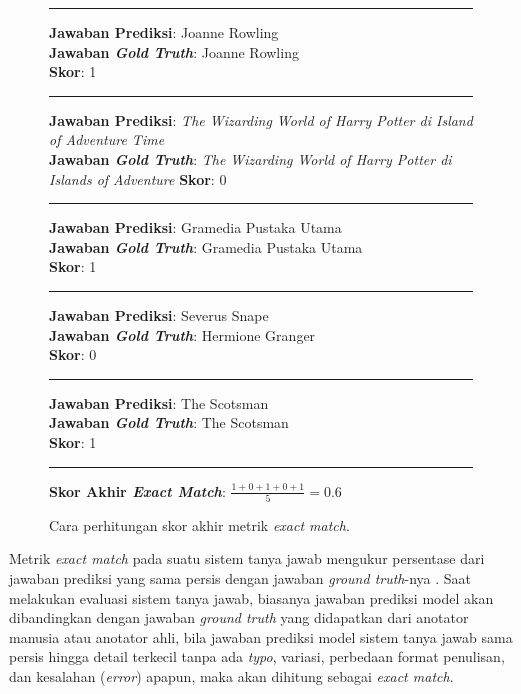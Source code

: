 \begin{figure}[h]
\vspace{3pt}
\hrule
\vspace{3pt}

\textbf{Jawaban Prediksi}: Joanne Rowling\\
\textbf{Jawaban \emph{Gold Truth}}: Joanne Rowling\\
\textbf{Skor}: 1

\vspace{3pt}
\hrule
\vspace{3pt}

\textbf{Jawaban Prediksi}: \emph{The Wizarding World of Harry Potter di Island of Adventure Time}\\
\textbf{Jawaban \emph{Gold Truth}}: \emph{The Wizarding World of Harry Potter di Islands of Adventure}
\textbf{Skor}: 0\\

\vspace{3pt}
\hrule
\vspace{3pt}

\textbf{Jawaban Prediksi}: Gramedia Pustaka Utama\\
\textbf{Jawaban \emph{Gold Truth}}: Gramedia Pustaka Utama\\
\textbf{Skor}: 1

\vspace{5pt}
\hrule
\vspace{5pt}

\textbf{Jawaban Prediksi}: Severus Snape\\
\textbf{Jawaban \emph{Gold Truth}}: Hermione Granger\\
\textbf{Skor}: 0

\vspace{3pt}
\hrule
\vspace{3pt}

\textbf{Jawaban Prediksi}: The Scotsman\\
\textbf{Jawaban \emph{Gold Truth}}: The Scotsman\\
\textbf{Skor}: 1

\vspace{3pt}
\hrule
\vspace{3pt}

\textbf{Skor Akhir \emph{Exact Match}}: $\frac{1+0+1+0+1}{5}=0.6$

\centering
\caption{Cara perhitungan skor akhir metrik \emph{exact match}.}
\end{figure}

Metrik \emph{exact match} pada suatu sistem tanya jawab mengukur persentase dari jawaban prediksi yang sama persis dengan jawaban \emph{ground truth}-nya \citep{rajpurkar-etal-2016-squad}. Saat melakukan evaluasi sistem tanya jawab, biasanya jawaban prediksi model akan dibandingkan dengan jawaban \emph{ground truth} yang didapatkan dari anotator manusia atau anotator ahli, bila jawaban prediksi model sistem tanya jawab sama persis hingga detail terkecil tanpa ada \emph{typo}, variasi, perbedaan format penulisan, dan kesalahan (\emph{error}) apapun, maka akan dihitung sebagai \emph{exact match}.

